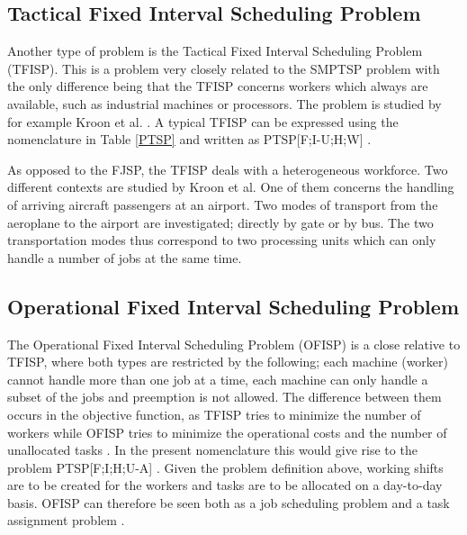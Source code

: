  	
\subsection{Tactical Fixed Interval Scheduling Problem}
Another type of problem is the Tactical Fixed Interval Scheduling Problem (TFISP). This is a problem very closely related to the SMPTSP problem with the only difference being that the TFISP concerns workers which always are available, such as industrial machines or processors. The problem is studied by for example Kroon et al. \citet{kroon_1995}. A typical TFISP can be expressed using the nomenclature in Table \ref{PTSP} and written as PTSP[F;I-U;H;W] \citet{krishnamoorthy_2001}.

As opposed to the FJSP, the TFISP deals with a heterogeneous workforce. Two different contexts are studied by Kroon et al. One of them concerns the handling of arriving aircraft passengers at an airport. Two modes of transport from the aeroplane to the airport are investigated; directly by gate or by bus. The two transportation modes thus correspond to two processing units which can only handle a number of jobs at the same time.

\subsection{Operational Fixed Interval Scheduling Problem}
The Operational Fixed Interval Scheduling Problem (OFISP) is a close relative to TFISP, where both types are restricted by the following; each machine (worker) cannot handle more than one job at a time, each machine can only handle a subset of the jobs and preemption is not allowed. The difference between them occurs in the objective function, as TFISP tries to minimize the number of workers while OFISP tries to minimize the operational costs and the number of unallocated tasks \citet{kroon_1995}. In the present nomenclature this would give rise to the problem PTSP[F;I;H;U-A] \citet{krishnamoorthy_2001}. Given the problem definition above, working shifts are to be created for the workers and tasks are to be allocated on a day-to-day basis. OFISP can therefore be seen both as a job scheduling problem and a task assignment problem \citet{kroon_1995}.



